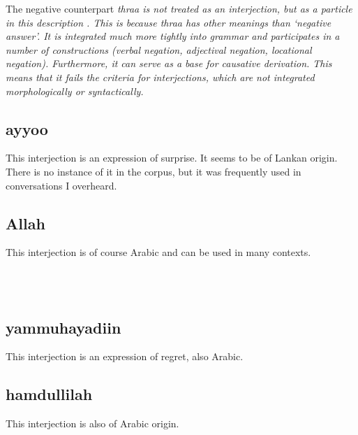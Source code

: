 The negative counterpart \em thraa \em is not treated as an interjection, but as a particle in this description . This is because \em thraa \em has other meanings than `negative answer'. It is integrated much more tightly into grammar and participates in a number of constructions (verbal negation, adjectival negation, locational negation). Furthermore, it can serve as a base for causative derivation. This means that it fails the criteria for interjections, which are not integrated morphologically or syntactically.

\subsection{ayyoo}\label{sec:wc:ayyoo}
This interjection is an expression of surprise. It seems to be of Lankan origin. There is no instance of it in the corpus, but it was frequently used in conversations I overheard.

\subsection{Allah}\label{sec:wc:Allah}
This interjection is of course Arabic and can be used in many contexts.


 \\


 \\


\subsection{yammuhayadiin}\label{sec:wc:yammuhayadiin}
 This interjection is an expression of regret, also Arabic.

\subsection{hamdullilah}\label{sec:wc:hamdullilah}
 This interjection is also of Arabic origin.

